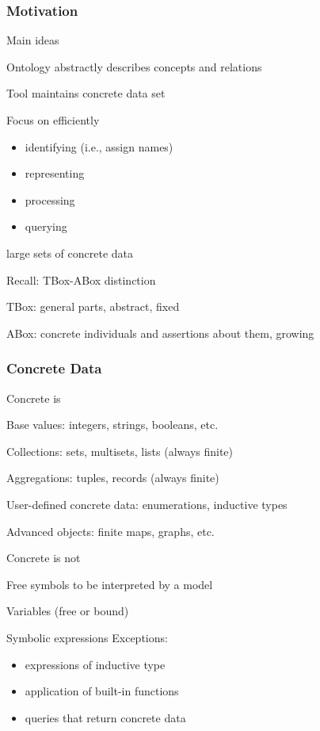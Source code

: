 \begin{frame}\frametitle{Motivation}
\begin{blockitems}{Main ideas}
\item Ontology abstractly describes concepts and relations
\item Tool maintains concrete data set
\item Focus on efficiently
  \begin{itemize}
  \item identifying (i.e., assign names)
  \item representing
  \item processing
  \item querying
  \end{itemize}
  large sets of concrete data
\end{blockitems}

\begin{blockitems}{Recall: TBox-ABox distinction}
  \item TBox: general parts, abstract, fixed
  \item ABox: concrete individuals and assertions about them, growing
\end{blockitems}
\end{frame}

\begin{frame}\frametitle{Concrete Data}
\begin{blockitems}{Concrete is}
\item Base values: integers, strings, booleans, etc.
\item Collections: sets, multisets, lists (always finite)
\item Aggregations: tuples, records (always finite)
\item User-defined concrete data: enumerations, inductive types
\item Advanced objects: finite maps, graphs, etc.
\end{blockitems}

\begin{blockitems}{Concrete is not}
\item Free symbols to be interpreted by a model
\item Variables (free or bound)
\item Symbolic expressions
 Exceptions:
  \begin{itemize}
  \item expressions of inductive type
  \item application of built-in functions
  \item queries that return concrete data
  \end{itemize}
\end{blockitems}
\end{frame}

